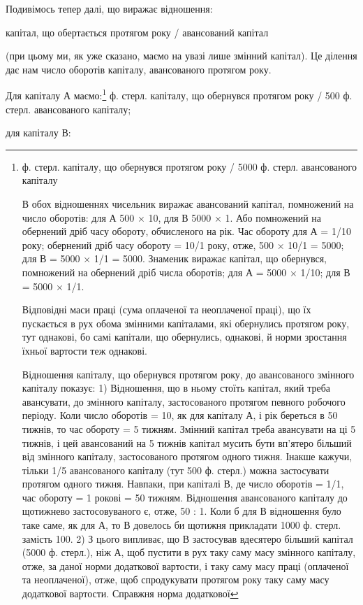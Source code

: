 Подивімось тепер далі, що виражає відношення:

капітал, що обертається протягом року / авансований капітал

(при цьому ми, як уже сказано, маємо на увазі лише змінний капітал).
Це ділення дає нам число оборотів капіталу, авансованого протягом року.

Для капіталу А маємо:\footnote{
ф. стерл. капіталу, що обернувся протягом року / 5000 ф. стерл. авансованого капіталу

В обох відношеннях чисельник виражає авансований капітал, помножений
на число оборотів: для А 500 × 10, для В 5000 × 1. Або помножений
на обернений дріб часу обороту, обчисленого на рік. Час
обороту для А = 1/10 року; обернений дріб часу обороту = 10/1 року,
отже, 500 × 10/1 = 5000; для В = 5000 × 1/1 = 5000. Знаменик виражає
капітал, що обернувся, помножений на обернений дріб числа
оборотів; для А = 5000 × 1/10; для В = 5000 × 1/1.

Відповідні маси праці (сума оплаченої та неоплаченої праці), що їх
пускається в рух обома змінними капіталами, які обернулись протягом
року, тут однакові, бо самі капітали, що обернулись, однакові, й норми
зростання їхньої вартости теж однакові.

Відношення капіталу, що обернувся протягом року, до авансованого
змінного капіталу показує: 1) Відношення, що в ньому стоїть капітал,
який треба авансувати, до змінного капіталу, застосованого протягом
певного робочого періоду. Коли число оборотів = 10, як для капіталу
А, і рік береться в 50 тижнів, то час обороту = 5 тижням. Змінний
капітал треба авансувати на ці 5 тижнів, і цей авансований на 5 тижнів
капітал мусить бути вп’ятеро більший від змінного капіталу, застосованого
протягом одного тижня. Інакше кажучи, тільки 1/5 авансованого
капіталу (тут 500 ф. стерл.) можна застосувати протягом одного тижня.
Навпаки, при капіталі В, де число оборотів = 1/1, час обороту = 1 рокові
= 50 тижням. Відношення авансованого капіталу до щотижнево застосовуваного
є, отже, 50 : 1. Коли б для В відношення було таке саме,
як для А, то В довелось би щотижня прикладати 1000 ф. стерл. замість
100. 2) З цього випливає, що В застосував вдесятеро більший
капітал (5000 ф. стерл.), ніж А, щоб пустити в рух таку саму масу змінного
капіталу, отже, за даної норми додаткової вартости, і таку саму
масу праці (оплаченої та неоплаченої), отже, щоб спродукувати протягом
року таку саму масу додаткової вартости. Справжня норма додаткової
} ф. стерл. капіталу, що обернувся протягом року / 500 ф. стерл. авансованого капіталу;

для капіталу В: